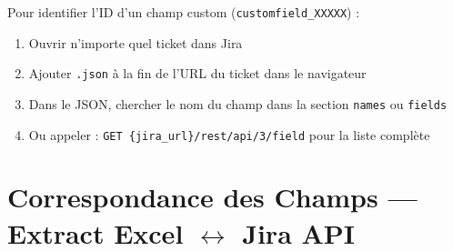 \documentclass[12pt, a4paper]{article}
\begin{document}
Pour identifier l'ID d'un champ custom (\texttt{customfield\_XXXXX}) :
\begin{enumerate}[leftmargin=2em, itemsep=2pt]
  \item Ouvrir n'importe quel ticket dans Jira
  \item Ajouter \texttt{.json} à la fin de l'URL du ticket dans le navigateur
  \item Dans le JSON, chercher le nom du champ dans la section \texttt{names} ou \texttt{fields}
  \item Ou appeler : \texttt{GET \{jira\_url\}/rest/api/3/field} pour la liste complète
\end{enumerate}

\vspace{0.3cm}

\section{Correspondance des Champs — Extract Excel $\leftrightarrow$ Jira API}

\vspace{0.3cm}
\end{document}
